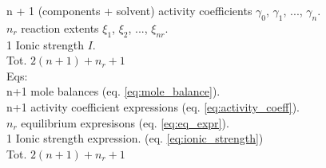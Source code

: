 \documentclass[onecolumn]{article}
\begin{document}
n + 1 (components + solvent) activity coefficients
$\gamma_0$, $\gamma_1$, ..., $\gamma_n$. \\
$n_r$ reaction extents $\xi_1$, $\xi_2$, ..., $\xi_{nr}$. \\
1 Ionic strength $I$. \\
Tot. $2(n + 1) + n_r + 1$ \\
Eqs: \\
n+1 mole balances (eq. \ref{eq:mole_balance}). \\
n+1 activity coefficient expressions (eq. \ref{eq:activity_coeff}). \\
$n_r$ equilibrium expresisons (eq. \ref{eq:eq_expr}). \\
1 Ionic strength expression. (eq. \ref{eq:ionic_strength})\\
Tot. $2(n + 1) + n_r + 1$
\end{document}
